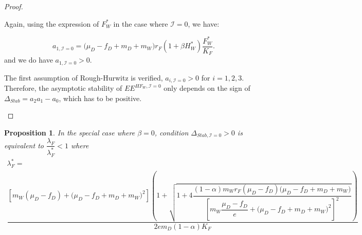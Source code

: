 \documentclass{article}
\newcommand{\lfw}{\lambda_{F}}
\newcommand{\lfw}{\lambda_{F}}
\newcommand{\cI}{\mathcal{I}}
\newtheorem{prop}{Proposition}
\begin{document}
\begin{proof}
\begin{itemize}
Again, using the expression of $F^*_W$ in the case where $\cI = 0$, we have:

\begin{equation*}
a_{1, \cI =0} = \big( \mu_D  -f_D + m_D + m_W) r_F(1+ \beta H_W^*) \dfrac{F^*_W}{K_F} .
\end{equation*}
and we do have $a_{1, \cI =0} > 0$.

The first assumption of Rough-Hurwitz is verified, $a_{i, \cI =0} > 0$ for $i=1,2,3$. Therefore, the asymptotic stability of $EE^{HF_W,  \cI =0}$ only depends on the sign of $\Delta_{Stab}= a_2 a_1 - a_0$, which has to be positive. 
\end{itemize}
\end{proof}


\begin{prop}
In the special case where $\beta = 0$, condition $\Delta_{Stab, \cI =0} > 0$ is equivalent to $\dfrac{\lfw}{\lfw^*} < 1$ where
\begin{multline*}
\lfw^* = \\
 \dfrac{\left[m_{W}(\mu_{D}-f_{D})+\big(\mu_{D}-f_{D}+m_{D}+m_{W})^{2}\right]\left(1+\sqrt{1+4\dfrac{(1-\alpha)m_{W}r_{F}\left(\mu_{D}-f_{D}\right)\big(\mu_{D}-f_{D}+m_{D}+m_{W})}{\left[m_{W}\dfrac{\mu_{D}-f_{D}}{e}+\big(\mu_{D}-f_{D}+m_{D}+m_{W})^{2}\right]^{2}}}\right)}{2em_D (1-\alpha) K_F }
\end{multline*}
\end{prop}
\end{document}
